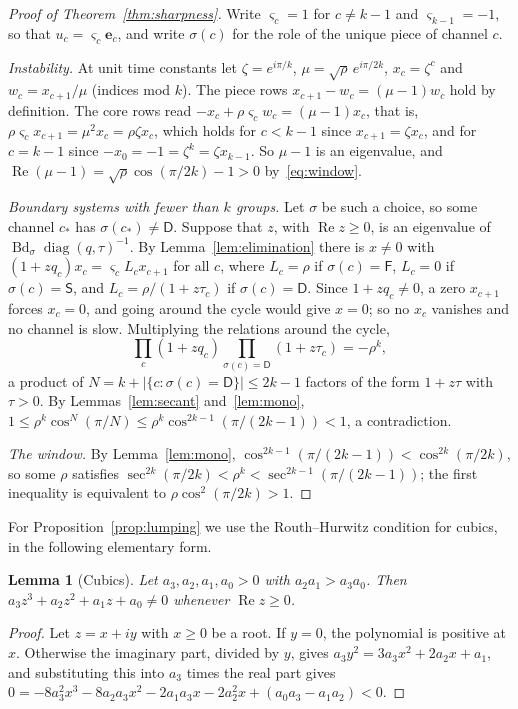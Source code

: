 \documentclass[11pt,a4paper]{article}
\theoremstyle{plain}
\newtheorem{lemma}[theorem]{Lemma}
\theoremstyle{definition}
\theoremstyle{remark}
\newcommand{\Real}{\operatorname{Re}}
\newcommand{\diag}{\operatorname{diag}}
\newcommand{\Bd}{\operatorname{Bd}}
\newcommand{\be}{\mathbf{e}}
\newcommand{\rF}{\mathsf{F}}
\newcommand{\rS}{\mathsf{S}}
\newcommand{\rD}{\mathsf{D}}
\begin{document}
\begin{proof}[Proof of Theorem~\ref{thm:sharpness}]
Write $\varsigma_c=1$ for $c\ne k-1$ and $\varsigma_{k-1}=-1$, so that
$u_c=\varsigma_c\be_c$, and write $\sigma(c)$ for the role of the unique piece of channel $c$.

\emph{Instability.} At unit time constants let $\zeta=e^{i\pi/k}$, $\mu=\sqrt\rho\,e^{i\pi/2k}$,
$x_c=\zeta^c$ and $w_c=x_{c+1}/\mu$ (indices mod $k$). The piece rows
$x_{c+1}-w_c=(\mu-1)w_c$ hold by definition. The core rows read
$-x_c+\rho\varsigma_cw_c=(\mu-1)x_c$, that is, $\rho\varsigma_cx_{c+1}=\mu^2x_c=\rho\zeta x_c$,
which holds for $c<k-1$ since $x_{c+1}=\zeta x_c$, and for $c=k-1$ since
$-x_0=-1=\zeta^k=\zeta x_{k-1}$. So $\mu-1$ is an eigenvalue, and
$\Real(\mu-1)=\sqrt\rho\cos(\pi/2k)-1>0$ by~\eqref{eq:window}.

\emph{Boundary systems with fewer than $k$ groups.} Let $\sigma$ be such a choice, so some
channel $c_*$ has $\sigma(c_*)\ne\rD$. Suppose that $z$, with $\Real z\ge0$, is an eigenvalue
of $\Bd_\sigma\diag(q,\tau)^{-1}$. By Lemma~\ref{lem:elimination} there is $x\ne0$ with
$(1+zq_c)x_c=\varsigma_cL_cx_{c+1}$ for all $c$, where $L_c=\rho$ if $\sigma(c)=\rF$,
$L_c=0$ if $\sigma(c)=\rS$, and $L_c=\rho/(1+z\tau_c)$ if $\sigma(c)=\rD$. Since
$1+zq_c\ne0$, a zero $x_{c+1}$ forces $x_c=0$, and going around the cycle would give $x=0$;
so no $x_c$ vanishes and no channel is slow. Multiplying the relations around the cycle,
\[
  \prod_{c}(1+zq_c)\prod_{\sigma(c)=\rD}(1+z\tau_c)=-\rho^k ,
\]
a product of $N=k+|\{c:\sigma(c)=\rD\}|\le2k-1$ factors of the form $1+z\tau$ with
$\tau>0$. By Lemmas~\ref{lem:secant} and~\ref{lem:mono},
$1\le\rho^k\cos^N(\pi/N)\le\rho^k\cos^{2k-1}(\pi/(2k-1))<1$, a contradiction.

\emph{The window.} By Lemma~\ref{lem:mono},
$\cos^{2k-1}(\pi/(2k-1))<\cos^{2k}(\pi/2k)$, so some $\rho$ satisfies
$\sec^{2k}(\pi/2k)<\rho^k<\sec^{2k-1}(\pi/(2k-1))$; the first inequality is equivalent to
$\rho\cos^2(\pi/2k)>1$.
\end{proof}

For Proposition~\ref{prop:lumping} we use the Routh--Hurwitz condition for cubics, in the
following elementary form.

\begin{lemma}[Cubics]\label{lem:cubic}
Let $a_3,a_2,a_1,a_0>0$ with $a_2a_1>a_3a_0$. Then $a_3z^3+a_2z^2+a_1z+a_0\ne0$ whenever
$\Real z\ge0$.
\end{lemma}

\begin{proof}
Let $z=x+iy$ with $x\ge0$ be a root. If $y=0$, the polynomial is positive at $x$. Otherwise
the imaginary part, divided by $y$, gives $a_3y^2=3a_3x^2+2a_2x+a_1$, and substituting this
into $a_3$ times the real part gives
$0=-8a_3^2x^3-8a_2a_3x^2-2a_1a_3x-2a_2^2x+(a_0a_3-a_1a_2)<0$.
\end{proof}
\end{document}
